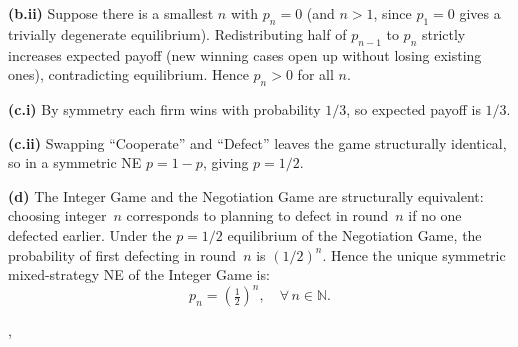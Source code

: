 {{    \textbf{(b.ii)} Suppose there is a smallest $n$ with $p_n = 0$ (and
    $n > 1$, since $p_1 = 0$ gives a trivially degenerate equilibrium).
    Redistributing half of $p_{n-1}$ to $p_n$ strictly increases expected
    payoff (new winning cases open up without losing existing ones),
    contradicting equilibrium. Hence $p_n > 0$ for all $n$.

    \textbf{(c.i)} By symmetry each firm wins with probability $1/3$,
    so expected payoff is $\boxed{1/3}$.

    \textbf{(c.ii)} Swapping ``Cooperate'' and ``Defect'' leaves the game
    structurally identical, so in a symmetric NE $p = 1-p$, giving
    $p = 1/2$.

    \textbf{(d)} The Integer Game and the Negotiation Game are structurally
    equivalent: choosing integer~$n$ corresponds to planning to defect in
    round~$n$ if no one defected earlier. Under the $p = 1/2$ equilibrium
    of the Negotiation Game, the probability of first defecting in round~$n$
    is $(1/2)^n$. Hence the unique symmetric mixed-strategy NE of the
    Integer Game is:
    \[
      p_n = \left(\tfrac{1}{2}\right)^n, \quad \forall\, n \in \mathbb{N}.
    \]
  },
}
